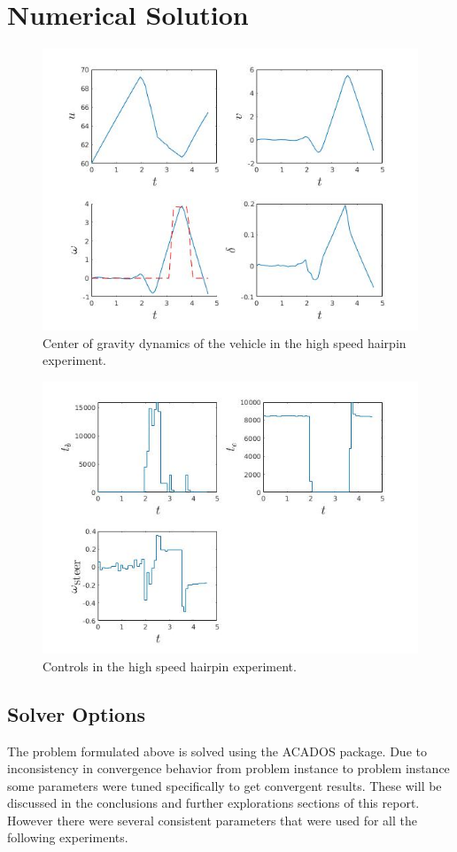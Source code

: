 \documentclass[conference,11pt]{IEEEtran}
\begin{document}
\section{Numerical Solution}
\begin{figure}[t]
  \centering
  \includegraphics[scale=0.5]{hairpin_brake_cg.jpg}
  \caption{Center of gravity dynamics of the vehicle in the high speed hairpin experiment.}
  \label{fig:hpcg0}
\end{figure}
\begin{figure}[b]
  \centering
  \includegraphics[scale=0.5]{hairpin_brake_u.jpg}
  \caption{Controls in the high speed hairpin experiment.}
  \label{fig:hpu0}
\end{figure}
\subsection{Solver Options}
The problem formulated above is solved using the ACADOS package. Due to inconsistency in convergence behavior from problem instance to problem instance some parameters were tuned specifically to
get convergent results. These will be discussed in the conclusions and further explorations sections of this report. However there were several consistent parameters that were used for
all the following experiments.
\end{document}
